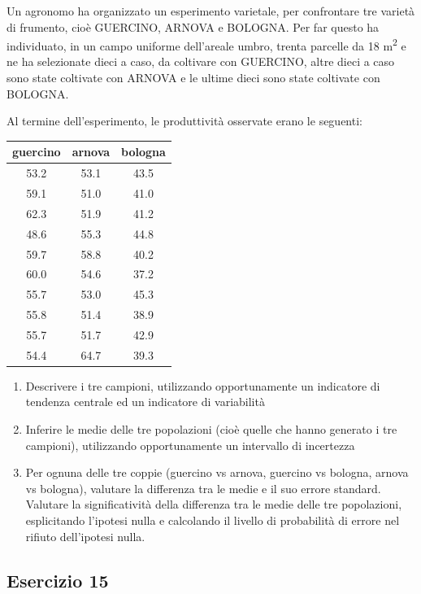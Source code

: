 \documentclass[a4paper,12pt,oneside]{book}
\providecommand{\tightlist}{%
  \setlength{\itemsep}{0pt}\setlength{\parskip}{0pt}}
\begin{document}
Un agronomo ha organizzato un esperimento varietale, per confrontare tre varietà di frumento, cioè GUERCINO, ARNOVA e BOLOGNA. Per far questo ha individuato, in un campo uniforme dell'areale umbro, trenta parcelle da 18 m\textsuperscript{2} e ne ha selezionate dieci a caso, da coltivare con GUERCINO, altre dieci a caso sono state coltivate con ARNOVA e le ultime dieci sono state coltivate con BOLOGNA.

Al termine dell'esperimento, le produttività osservate erano le seguenti:

\begin{tabular}{c|c|c}
\hline
guercino & arnova & bologna\\
\hline
53.2 & 53.1 & 43.5\\
\hline
59.1 & 51.0 & 41.0\\
\hline
62.3 & 51.9 & 41.2\\
\hline
48.6 & 55.3 & 44.8\\
\hline
59.7 & 58.8 & 40.2\\
\hline
60.0 & 54.6 & 37.2\\
\hline
55.7 & 53.0 & 45.3\\
\hline
55.8 & 51.4 & 38.9\\
\hline
55.7 & 51.7 & 42.9\\
\hline
54.4 & 64.7 & 39.3\\
\hline
\end{tabular}

\begin{enumerate}
\def\labelenumi{\arabic{enumi}.}
\tightlist
\item
  Descrivere i tre campioni, utilizzando opportunamente un indicatore di tendenza centrale ed un indicatore di variabilità
\item
  Inferire le medie delle tre popolazioni (cioè quelle che hanno generato i tre campioni), utilizzando opportunamente un intervallo di incertezza
\item
  Per ognuna delle tre coppie (guercino vs arnova, guercino vs bologna, arnova vs bologna), valutare la differenza tra le medie e il suo errore standard. Valutare la significatività della differenza tra le medie delle tre popolazioni, esplicitando l'ipotesi nulla e calcolando il livello di probabilità di errore nel rifiuto dell'ipotesi nulla.
\end{enumerate}

\hypertarget{esercizio-15}{%
\subsection{Esercizio 15}\label{esercizio-15}}
\end{document}
